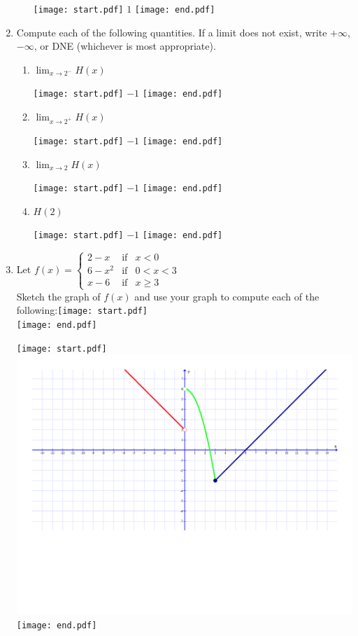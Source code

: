 \documentclass[12pt]{article}
\begin{document}
\begin{enumerate}
\begin{enumerate}
\texttt{[image: start.pdf]}
{{$1$}}
\texttt{[image: end.pdf]}


\end{enumerate}

\item Compute each of the following quantities.  If a limit does not exist, write $+\infty$, $-\infty$, or DNE (whichever is most appropriate). 

\begin{enumerate}

\item $\displaystyle \lim_{x \rightarrow 2^{-}}{H(x)}$

\texttt{[image: start.pdf]}
{{$-1$}}
\texttt{[image: end.pdf]}


\item $\displaystyle \lim_{x \rightarrow 2^{+}}{H(x)}$

\texttt{[image: start.pdf]}
{{$-1$}}
\texttt{[image: end.pdf]}


\item $\displaystyle \lim_{x \rightarrow 2}{H(x)}$

\texttt{[image: start.pdf]}
{{$-1$}}
\texttt{[image: end.pdf]}


\item $H(2)$

\texttt{[image: start.pdf]}
{{$-1$}}
\texttt{[image: end.pdf]}


\end{enumerate}

\item Let $\displaystyle f(x)=\left\{ 
\begin{array}{lll}
2-x & \text{if} & x < 0\\
6-x^2& \text{if} & 0<x<3 \\
x-6 & \text{if} & x \geq 3
\end{array}\right.$\\
Sketch the graph of $f(x)$ and use your graph to compute each of the following:\texttt{[image: start.pdf]}
{\\}
\texttt{[image: end.pdf]}


\texttt{[image: start.pdf]}
{{\includegraphics[scale=0.5]{graph.pdf}}}
\texttt{[image: end.pdf]}



\end{enumerate}
\end{document}
